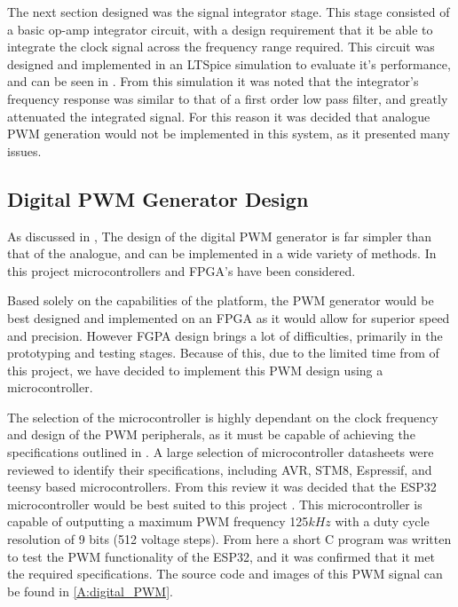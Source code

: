 The next section designed was the signal integrator stage. This stage consisted of a basic op-amp integrator circuit, with a design requirement that it be able to integrate the clock signal across the frequency range required. This circuit was designed and implemented in an LTSpice simulation to evaluate it's performance, and can be seen in . From this simulation it was noted that the integrator's frequency response was similar to that of a first order low pass filter, and greatly attenuated the integrated signal. For this reason it was decided that analogue PWM generation would not be implemented in this system, as it presented many issues.

\subsection{Digital PWM Generator Design}\label{S:digital_design}

As discussed in , The design of the digital PWM generator is far simpler than that of the analogue, and can be implemented in a wide variety of methods. In this project microcontrollers and FPGA's have been considered.

Based solely on the capabilities of the platform, the PWM generator would be best designed and implemented on an FPGA as it would allow for superior speed and precision. However FGPA design brings a lot of difficulties, primarily in the prototyping and testing stages. Because of this, due to the limited time from of this project, we have decided to implement this PWM design using a microcontroller.

The selection of the microcontroller is highly dependant on the clock frequency and design of the PWM peripherals, as it must be capable of achieving the specifications outlined in . A large selection of microcontroller datasheets were reviewed to identify their specifications, including AVR, STM8, Espressif, and teensy based microcontrollers. From this review it was decided that the ESP32 microcontroller would be best suited to this project \cite{ESP32Manual}. This microcontroller is capable of outputting a maximum PWM frequency 125$kHz$ with a duty cycle resolution of 9 bits (512 voltage steps). From here a short C program was written to test the PWM functionality of the ESP32, and it was confirmed that it met the required specifications. The source code and images of this PWM signal can be found in \ref{A:digital_PWM}.